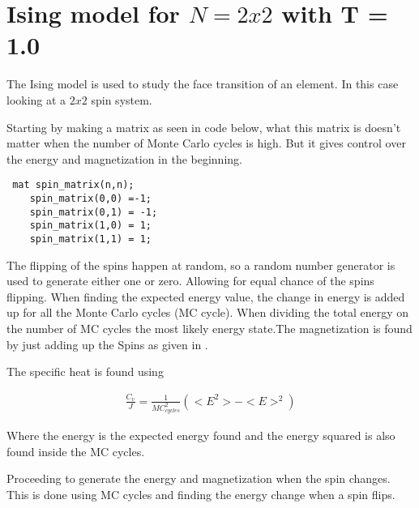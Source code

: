 \section{Ising model for $N = 2x2$  with T = 1.0}

The Ising model is used to study the face transition of an element. In this case looking at a $2x2$ spin system. 

Starting by making a matrix as seen in code below, what this matrix is doesn't matter when the number of Monte Carlo cycles is high. But it gives control over the energy and magnetization in the beginning. 

\begin{lstlisting}
 mat spin_matrix(n,n);
    spin_matrix(0,0) =-1;
    spin_matrix(0,1) = -1;
    spin_matrix(1,0) = 1;
    spin_matrix(1,1) = 1;

\end{lstlisting}

The flipping of the spins happen at random, so a random number generator is used to generate either one or zero. Allowing for equal chance of the spins flipping. When finding the expected energy value, the change in energy is added up for all the Monte Carlo cycles (MC cycle). When dividing the total energy on the number of MC cycles the most likely energy state.The magnetization is found by just adding up the Spins as given in . 

The specific heat is found using 

\begin{align}
\frac{C_v}{J} = \frac{1}{MC_{cycles}^2} (<E^2> - <E>^2)
\end{align}

Where the energy is the expected energy found and the energy squared is also found inside the MC cycles.   


Proceeding to generate the energy and magnetization when the spin changes. This is done using MC cycles and finding the energy change when a spin flips. 

